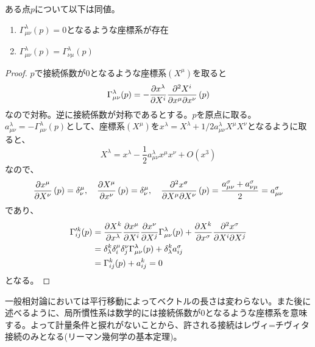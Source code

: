     \begin{thm}
        ある点$p$について以下は同値。
        \begin{enumerate}
            \item $\Gamma^\lambda_{\mu\nu}(p) = 0$となるような座標系が存在
            \item $\Gamma^\lambda_{\mu\nu}(p) = \Gamma^\lambda_{\nu\mu}(p)$
        \end{enumerate}
    \end{thm}
    \begin{proof}
        $p$で接続係数が0となるような座標系$(X^\mu)$を取ると
            \[\Gamma^\lambda_{\mu\nu}(p) = -\pdv{x^\lambda}{X^i}(p)\pdv{X^i}{x^\mu}{x^\nu}\left(p\right)\]
        なので対称。逆に接続係数が対称であるとする。$p$を原点に取る。$a^\lambda_{\mu\nu} = -\Gamma^\lambda_{\mu\nu}(p)$として、座標系$(X^\mu)$を$x^\lambda = X^\lambda + 1/2 a^\lambda_{\mu\nu} X^\mu X^\nu$となるように取ると、
            \[X^\lambda = x^\lambda - \frac{1}{2} a^\lambda_{\mu\nu} x^\mu x^\nu + O(x^3)\]
        なので、
            \[\pdv{x^\mu}{X^\nu}\left(p\right) = \delta^\mu_\nu, \quad \pdv{X^\mu}{x^\nu}\left(p\right) = \delta^\mu_\nu, \quad \pdv{x^\sigma}{X^\mu}{X^\nu}\left(p\right) = \frac{a^\sigma_{\mu\nu} + a^\sigma_{\nu\mu}}{2} = a^\sigma_{\mu\nu}\]
        であり、
        \begin{align*}
            \Gamma'^k_{ij}(p)
                &= \pdv{X^k}{x^\lambda}\pdv{x^\mu}{X^i}\pdv{x^\nu}{X^j}\Gamma^\lambda_{\mu\nu}(p) + \pdv{X^k}{x^\sigma}\pdv{x^\sigma}{X^i}{X^j}\\
                &= \delta^k_\lambda \delta^\mu_i \delta^\nu_j \Gamma^\lambda_{\mu\nu}(p) + \delta^k_\lambda a^\sigma_{ij}\\
                &= \Gamma^k_{ij}(p) + a^k_{ij} = 0
        \end{align*}
        となる。
    \end{proof}

    一般相対論においては平行移動によってベクトルの長さは変わらない。また後に述べるように、局所慣性系は数学的には接続係数が0となるような座標系を意味する。よって計量条件と捩れがないことから、許される接続はレヴィ=チヴィタ接続のみとなる(リーマン幾何学の基本定理)。

